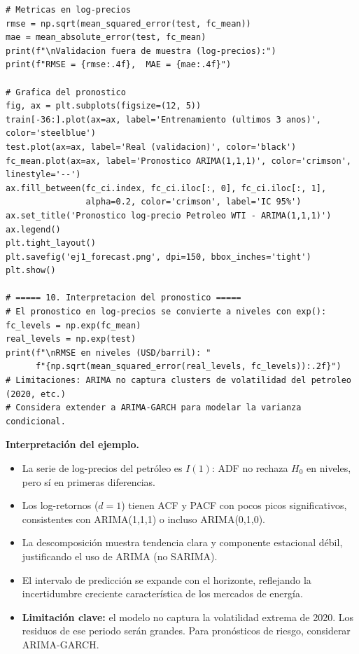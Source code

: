 \documentclass[12pt,a4paper]{article}
\theoremstyle{definition}
\begin{document}
\begin{lstlisting}[style=python, caption={Ejemplo 1: ARIMA para log-precios del petróleo WTI}]
# Metricas en log-precios
rmse = np.sqrt(mean_squared_error(test, fc_mean))
mae = mean_absolute_error(test, fc_mean)
print(f"\nValidacion fuera de muestra (log-precios):")
print(f"RMSE = {rmse:.4f},  MAE = {mae:.4f}")

# Grafica del pronostico
fig, ax = plt.subplots(figsize=(12, 5))
train[-36:].plot(ax=ax, label='Entrenamiento (ultimos 3 anos)', color='steelblue')
test.plot(ax=ax, label='Real (validacion)', color='black')
fc_mean.plot(ax=ax, label='Pronostico ARIMA(1,1,1)', color='crimson', linestyle='--')
ax.fill_between(fc_ci.index, fc_ci.iloc[:, 0], fc_ci.iloc[:, 1],
                alpha=0.2, color='crimson', label='IC 95%')
ax.set_title('Pronostico log-precio Petroleo WTI - ARIMA(1,1,1)')
ax.legend()
plt.tight_layout()
plt.savefig('ej1_forecast.png', dpi=150, bbox_inches='tight')
plt.show()

# ===== 10. Interpretacion del pronostico =====
# El pronostico en log-precios se convierte a niveles con exp():
fc_levels = np.exp(fc_mean)
real_levels = np.exp(test)
print(f"\nRMSE en niveles (USD/barril): "
      f"{np.sqrt(mean_squared_error(real_levels, fc_levels)):.2f}")
# Limitaciones: ARIMA no captura clusters de volatilidad del petroleo (2020, etc.)
# Considera extender a ARIMA-GARCH para modelar la varianza condicional.
\end{lstlisting}

\noindent\textbf{Interpretación del ejemplo.}
\begin{itemize}[nosep]
  \item La serie de log-precios del petróleo es $I(1)$: ADF no rechaza $H_0$
        en niveles, pero sí en primeras diferencias.
  \item Los log-retornos ($d=1$) tienen ACF y PACF con pocos picos significativos,
        consistentes con ARIMA(1,1,1) o incluso ARIMA(0,1,0).
  \item La descomposición muestra tendencia clara y componente estacional débil,
        justificando el uso de ARIMA (no SARIMA).
  \item El intervalo de predicción se expande con el horizonte, reflejando la
        incertidumbre creciente característica de los mercados de energía.
  \item \textbf{Limitación clave:} el modelo no captura la volatilidad extrema
        de 2020. Los residuos de ese periodo serán grandes. Para pronósticos de
        riesgo, considerar ARIMA-GARCH.
\end{itemize}

\end{document}
